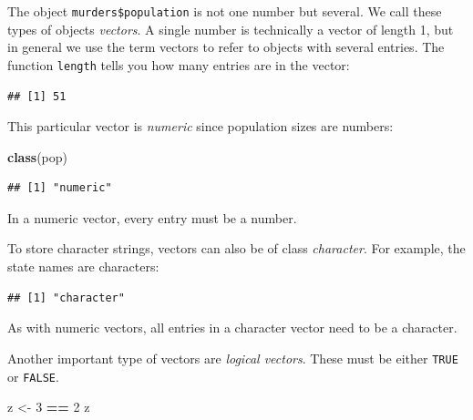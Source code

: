 \documentclass[
]{article}
\newenvironment{Shaded}{\begin{snugshade}}{\end{snugshade}}
\newcommand{\DecValTok}[1]{\textcolor[rgb]{0.00,0.00,0.81}{#1}}
\newcommand{\FunctionTok}[1]{\textcolor[rgb]{0.13,0.29,0.53}{\textbf{#1}}}
\newcommand{\NormalTok}[1]{#1}
\newcommand{\OtherTok}[1]{\textcolor[rgb]{0.56,0.35,0.01}{#1}}
\newcommand{\SpecialCharTok}[1]{\textcolor[rgb]{0.81,0.36,0.00}{\textbf{#1}}}
\begin{document}
The object \texttt{murders\$population} is not one number but several.
We call these types of objects \emph{vectors}. A single number is
technically a vector of length 1, but in general we use the term vectors
to refer to objects with several entries. The function \texttt{length}
tells you how many entries are in the vector:

\begin{Shaded}
\end{Shaded}

\begin{verbatim}
## [1] 51
\end{verbatim}

This particular vector is \emph{numeric} since population sizes are
numbers:

\begin{Shaded}
\begin{Highlighting}[]
\FunctionTok{class}\NormalTok{(pop)}
\end{Highlighting}
\end{Shaded}

\begin{verbatim}
## [1] "numeric"
\end{verbatim}

In a numeric vector, every entry must be a number.

To store character strings, vectors can also be of class
\emph{character}. For example, the state names are characters:

\begin{Shaded}
\end{Shaded}

\begin{verbatim}
## [1] "character"
\end{verbatim}

As with numeric vectors, all entries in a character vector need to be a
character.

Another important type of vectors are \emph{logical vectors}. These must
be either \texttt{TRUE} or \texttt{FALSE}.

\begin{Shaded}
\begin{Highlighting}[]
\NormalTok{z }\OtherTok{\textless{}{-}} \DecValTok{3} \SpecialCharTok{==} \DecValTok{2}
\NormalTok{z}
\end{Highlighting}
\end{Shaded}
\end{document}
